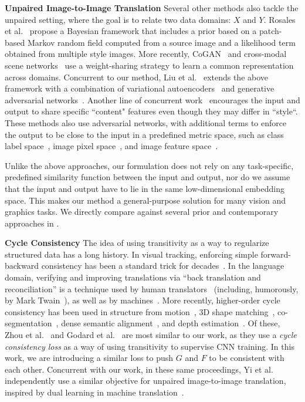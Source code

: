 {\bf Unpaired Image-to-Image Translation}
Several other methods also tackle the unpaired setting, where the goal is to relate two data domains: $X$ and $Y$. Rosales et al.~ propose a Bayesian framework that includes a prior based on a patch-based Markov random field computed from a source image and a likelihood term obtained from multiple style images. More recently, CoGAN~\cite{liu2016coupled} and cross-modal scene networks~\cite{aytar2016cross} use a weight-sharing strategy to learn a common representation across domains. 
Concurrent to our method, Liu et al.~ extends the above framework with a combination of variational autoencoders~\cite{kingma2013auto} and generative adversarial networks~\cite{goodfellow2014generative}.
Another line of concurrent work~\cite{shrivastava2016learning,taigman2016unsupervised,bousmalis2016unsupervised} encourages the input and output to share specific ``content" features even though they may differ in ``style``. These methods also use adversarial networks, with additional terms to enforce the output to be close to the input in a predefined metric space, such as class label space~\cite{bousmalis2016unsupervised}, image pixel space~\cite{shrivastava2016learning}, and image feature space~\cite{taigman2016unsupervised}. 

Unlike the above approaches, our formulation does not rely on any task-specific, predefined similarity function between the input and output, nor do we assume that the input and output have to lie in the same low-dimensional embedding space. This makes our method a general-purpose solution for many vision and graphics tasks. We directly compare against several prior and contemporary approaches in .

{\bf Cycle Consistency}
The idea of using transitivity as a way to regularize structured data has a long history.  In visual tracking, enforcing simple forward-backward consistency has been a standard trick for decades~\cite{kalal2010forward,sundaram2010dense}. In the language domain, verifying and improving translations via ``back translation and reconciliation'' is a technique used by human translators~\cite{brislin1970back} (including, humorously, by Mark Twain~\cite{twain1903}), as well as by machines~\cite{he2016dual}. 
More recently, higher-order cycle consistency has been used in
structure from motion~\cite{zach2010disambiguating},
3D shape matching~\cite{huang2013consistent}, co-segmentation~\cite{wang2013image}, dense semantic alignment~\cite{zhou2015flowweb,zhou2016learning}, and depth estimation~\cite{godard2016unsupervised}.  Of these, Zhou et al.~\cite{zhou2016learning} and Godard et al.~\cite{godard2016unsupervised} are most similar to our work, as they use a {\em cycle consistency loss} as a way of using transitivity to supervise CNN training.
In this work, we are introducing a similar loss to push $G$ and $F$ to be consistent with each other.  Concurrent with our work, in these same proceedings, Yi et al.~\cite{yi2017dualgan} independently use a similar objective for unpaired image-to-image translation, inspired by dual learning in machine translation~\cite{he2016dual}.

